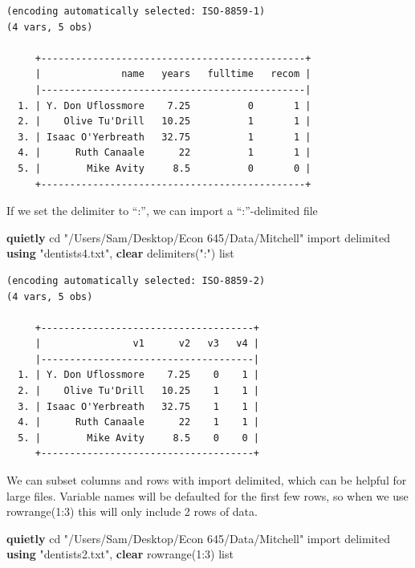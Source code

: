 \documentclass[
]{book}
\newenvironment{Shaded}{\begin{snugshade}}{\end{snugshade}}
\newcommand{\KeywordTok}[1]{\textcolor[rgb]{0.13,0.29,0.53}{\textbf{#1}}}
\newcommand{\NormalTok}[1]{#1}
\newcommand{\OtherTok}[1]{\textcolor[rgb]{0.56,0.35,0.01}{#1}}
\newcommand{\StringTok}[1]{\textcolor[rgb]{0.31,0.60,0.02}{#1}}
\begin{document}
\begin{verbatim}
(encoding automatically selected: ISO-8859-1)
(4 vars, 5 obs)

     +----------------------------------------------+
     |              name   years   fulltime   recom |
     |----------------------------------------------|
  1. | Y. Don Uflossmore    7.25          0       1 |
  2. |    Olive Tu'Drill   10.25          1       1 |
  3. | Isaac O'Yerbreath   32.75          1       1 |
  4. |      Ruth Canaale      22          1       1 |
  5. |        Mike Avity     8.5          0       0 |
     +----------------------------------------------+
\end{verbatim}

If we set the delimiter to ``:'', we can import a ``:''-delimited file

\begin{Shaded}
\begin{Highlighting}[]
\KeywordTok{quietly}\NormalTok{ cd }\StringTok{"/Users/Sam/Desktop/Econ 645/Data/Mitchell"}
\NormalTok{import delimited }\KeywordTok{using} \StringTok{"dentists4.txt"}\NormalTok{, }\KeywordTok{clear}\NormalTok{ delimiters(}\StringTok{":"}\NormalTok{) }
\OtherTok{list}
\end{Highlighting}
\end{Shaded}

\begin{verbatim}
(encoding automatically selected: ISO-8859-2)
(4 vars, 5 obs)

     +-------------------------------------+
     |                v1      v2   v3   v4 |
     |-------------------------------------|
  1. | Y. Don Uflossmore    7.25    0    1 |
  2. |    Olive Tu'Drill   10.25    1    1 |
  3. | Isaac O'Yerbreath   32.75    1    1 |
  4. |      Ruth Canaale      22    1    1 |
  5. |        Mike Avity     8.5    0    0 |
     +-------------------------------------+
\end{verbatim}

We can subset columns and rows with import delimited, which can be helpful for large files. Variable names will be defaulted for the first few rows, so when we use rowrange(1:3) this will only include 2 rows of data.

\begin{Shaded}
\begin{Highlighting}[]
\KeywordTok{quietly}\NormalTok{ cd }\StringTok{"/Users/Sam/Desktop/Econ 645/Data/Mitchell"}
\NormalTok{import delimited }\KeywordTok{using} \StringTok{"dentists2.txt"}\NormalTok{, }\KeywordTok{clear}\NormalTok{ rowrange(1:3)}
\OtherTok{list}
\end{Highlighting}
\end{Shaded}
\end{document}
